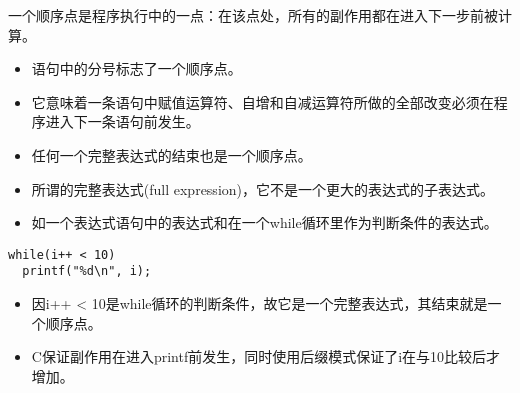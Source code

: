 \begin{frame}[fragile]
一个顺序点是程序执行中的一点：在该点处，所有的副作用都在进入下一步前被计算。

\end{frame}

\begin{frame}[fragile]


\begin{itemize}
\item
\textcolor{acolor1}{语句中的分号标志了一个顺序点。} \\[0.1in]
\item[] 它意味着一条语句中赋值运算符、自增和自减运算符所做的全部改变必须在程序进入下一条语句前发生。\\[0.1in]
\item \textcolor{acolor1}{任何一个完整表达式的结束也是一个顺序点。}\\[0.1in]
\item[] 所谓的完整表达式(full expression)，它不是一个更大的表达式的子表达式。\\[0.1in]
\item[]  如一个表达式语句中的表达式和在一个while循环里作为判断条件的表达式。
\end{itemize}
\end{frame}

\begin{frame}[fragile]

\begin{lstlisting}[backgroundcolor=\color{red!10}]
while(i++ < 10)
  printf("%d\n", i);
\end{lstlisting}

\begin{itemize}
\item\tf 因i++ < 10是while循环的判断条件，故它是一个完整表达式，其结束就是一个顺序点。\\[0.1in] 
\item C保证副作用在进入printf前发生，同时使用后缀模式保证了i在与10比较后才增加。

\end{itemize}

\end{frame}


